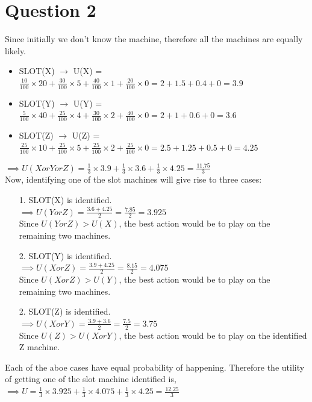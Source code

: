 \documentclass[letter, 10pt]{article}
\begin{document}
\newpage

\section*{Question 2}
Since initially we don't know the machine, therefore all the machines are equally likely.
\begin{itemize}
    \item SLOT(X) $\rightarrow$ U(X) = $\frac{10}{100}\times20+\frac{30}{100}\times5+\frac{40}{100}\times1+\frac{20}{100}\times0 = 2+1.5+0.4+0 = 3.9$
    \item SLOT(Y) $\rightarrow$ U(Y) = $\frac{5}{100}\times40+\frac{25}{100}\times4+\frac{30}{100}\times2+\frac{40}{100}\times0 = 2+1+0.6+0 = 3.6$
    \item SLOT(Z) $\rightarrow$ U(Z) = $\frac{25}{100}\times10+\frac{25}{100}\times5+\frac{25}{100}\times2+\frac{25}{100}\times0 = 2.5+1.25+0.5+0 = 4.25$
\end{itemize}
$\implies U(X or Y or Z) = \frac{1}{3}\times3.9+\frac{1}{3}\times3.6+\frac{1}{3}\times4.25 = \frac{11.75}{3}$\\

Now, identifying one of the slot machines will give rise to three cases:
\begin{itemize}
    \item[1.] SLOT(X) is identified.\\
    $\implies U(Y or Z) = \frac{3.6 + 4.25}{2} = \frac{7.85}{2} = 3.925$\\
    Since $U(Y or Z)>U(X)$, the best action would be to play on the remaining two machines.
    \item[2.] SLOT(Y) is identified.\\
    $\implies U(X or Z) = \frac{3.9 + 4.25}{2} = \frac{8.15}{2} = 4.075$\\
    Since $U(X or Z)>U(Y)$, the best action would be to play on the remaining two machines.
    \item[2.] SLOT(Z) is identified.\\
    $\implies U(X or Y) = \frac{3.9 + 3.6}{2} = \frac{7.5}{2} = 3.75$\\
    Since $U(Z)>U(XorY)$, the best action would be to play on the identified Z machine.
\end{itemize}

Each of the aboe cases have equal probability of happening. Therefore the utility of getting one of the slot machine identified is,\\
$\implies U = \frac{1}{3}\times3.925+\frac{1}{3}\times4.075+\frac{1}{3}\times4.25 = \frac{12.25}{3}$\\
\end{document}
